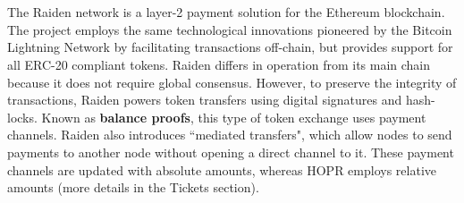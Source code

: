 \\~\\The Raiden network is a layer-2 payment solution for the Ethereum blockchain. The project employs the same technological innovations pioneered by the Bitcoin Lightning Network by facilitating transactions off-chain, but provides support for all ERC-20 compliant tokens. Raiden differs in operation from its main chain because it does not require global consensus. However, to preserve the integrity of transactions, Raiden powers token transfers using digital signatures and hash-locks. Known as \textbf{balance proofs}, this type of token exchange uses payment channels. Raiden also introduces ``mediated transfers", which allow nodes to send payments to another node without opening a direct channel to it. These payment channels are updated with absolute amounts, whereas HOPR employs relative amounts (more details in the Tickets section).

